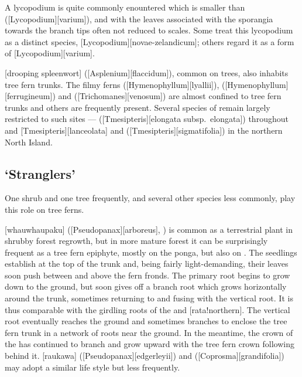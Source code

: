 A lycopodium is quite commonly enountered which is smaller than  ([Lycopodium][varium]), and with the leaves associated with the sporangia towards the branch tips often not reduced to scales.
Some treat this lycopodium as a distinct species, [Lycopodium][novae-zelandicum]; others regard it as a form of [Lycopodium][varium].

[drooping spleenwort] ([Asplenium][flaccidum]), common on trees, also inhabits tree fern trunks.
The filmy ferns  ([Hymenophyllum][lyallii]),  ([Hymenophyllum][ferrugineum]) and  ([Trichomanes][venosum]) are almost confined to tree fern trunks and others are frequently present.
Several species of  remain largely restricted to such sites ---  ([Tmesipteris][elongata subsp.\ elongata]) throughout and [Tmesipteris][lanceolata] and  ([Tmesipteris][sigmatifolia]) in the northern North Island.

\subsection{`Stranglers'}

One shrub and one tree frequently, and several other species less commonly, play this role on tree ferns.

[whauwhaupaku] ([Pseudopanax][arboreus], ) is common as a terrestrial plant in shrubby forest regrowth, but in more mature forest it can be surprisingly frequent as a tree fern epiphyte, mostly on the ponga, but also on .
The seedlings establish at the top of the trunk and, being fairly light-demanding, their leaves soon push between and above the fern fronds.
The primary root begins to grow down to the ground, but soon gives off a branch root which grows horizontally around the trunk, sometimes returning to and fusing with the vertical root.
It is thus comparable with the girdling roots of the  and [rata!northern].
The vertical root eventually reaches the ground and sometimes branches to enclose the tree fern trunk in a network of roots near the ground.
In the meantime, the crown of the  has continued to branch and grow upward with the tree fern crown following behind it.
[raukawa] ([Pseudopanax][edgerleyii]) and  ([Coprosma][grandifolia]) may adopt a similar life style but less frequently.


